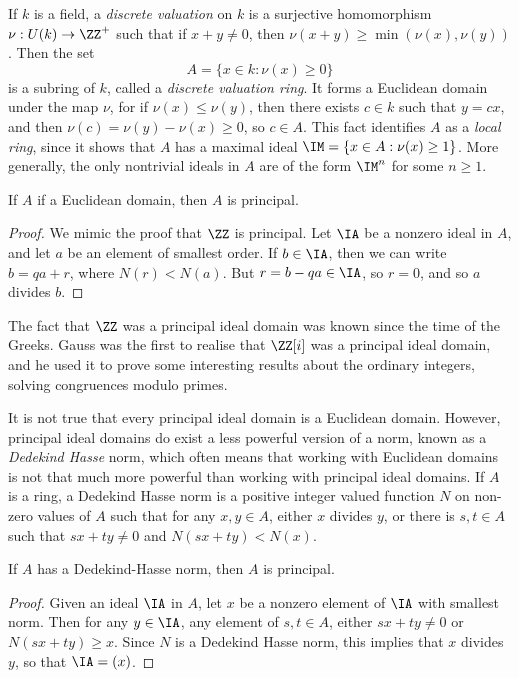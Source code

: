 \begin{example}
    If $k$ is a field, a \emph{discrete valuation} on $k$ is a surjective homomorphism $\nu: U(k) \to \ZZ^+$ such that if $x + y \neq 0$, then $\nu(x + y) \geq \min(\nu(x),\nu(y))$. Then the set
    \[ A = \{ x \in k: \nu(x) \geq 0 \} \]
    is a subring of $k$, called a \emph{discrete valuation ring}. It forms a Euclidean domain under the map $\nu$, for if $\nu(x) \leq \nu(y)$, then there exists $c \in k$ such that $y = cx$, and then $\nu(c) = \nu(y) - \nu(x) \geq 0$, so $c \in A$. This fact identifies $A$ as a \emph{local ring}, since it shows that $A$ has a maximal ideal $\IM = \{ x \in A: \nu(x) \geq 1 \}$. More generally, the only nontrivial ideals in $A$ are of the form $\IM^n$ for some $n \geq 1$.
\end{example}

\begin{theorem}
    If $A$ if a Euclidean domain, then $A$ is principal.
\end{theorem}
\begin{proof}
    We mimic the proof that $\ZZ$ is principal. Let $\IA$ be a nonzero ideal in $A$, and let $a$ be an element of smallest order. If $b \in \IA$, then we can write $b = qa + r$, where $N(r) < N(a)$. But $r = b - qa \in \IA$, so $r = 0$, and so $a$ divides $b$.
\end{proof}

The fact that $\ZZ$ was a principal ideal domain was known since the time of the Greeks. Gauss was the first to realise that $\ZZ[i]$ was a principal ideal domain, and he used it to prove some interesting results about the ordinary integers, solving congruences modulo primes.

It is not true that every principal ideal domain is a Euclidean domain. However, principal ideal domains do exist a less powerful version of a norm, known as a \emph{Dedekind Hasse} norm, which often means that working with Euclidean domains is not that much more powerful than working with principal ideal domains. If $A$ is a ring, a Dedekind Hasse norm is a positive integer valued function $N$ on non-zero values of $A$ such that for any $x,y \in A$, either $x$ divides $y$, or there is $s,t \in A$ such that $sx + ty \neq 0$ and $N(sx + ty) < N(x)$.

\begin{theorem}
    If $A$ has a Dedekind-Hasse norm, then $A$ is principal.
\end{theorem}
\begin{proof}
    Given an ideal $\IA$ in $A$, let $x$ be a nonzero element of $\IA$ with smallest norm. Then for any $y \in \IA$, any element of $s,t \in A$, either $sx + ty \neq 0$ or $N(sx + ty) \geq x$. Since $N$ is a Dedekind Hasse norm, this implies that $x$ divides $y$, so that $\IA = (x)$.
\end{proof}

